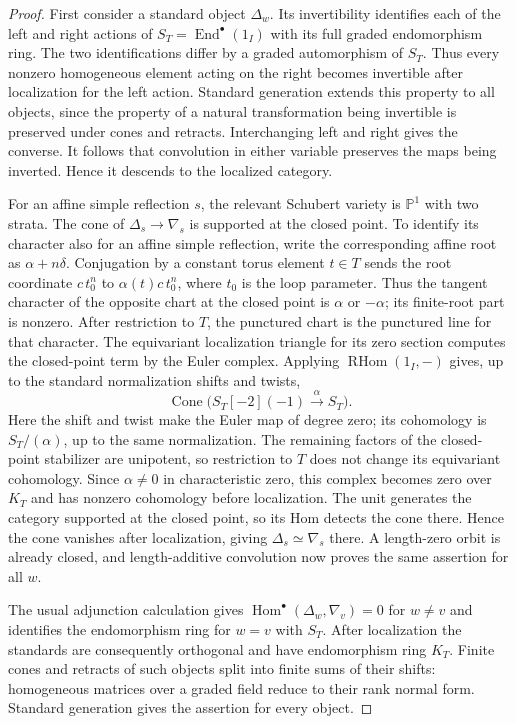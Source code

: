 \documentclass[11pt]{article}
\numberwithin{equation}{section}
\theoremstyle{definition}
\theoremstyle{remark}
\newcommand{\Hom}{\operatorname{Hom}}
\newcommand{\RHom}{\operatorname{RHom}}
\newcommand{\End}{\operatorname{End}}
\begin{document}
\begin{proof}
First consider a standard object $\Delta_w$.  Its invertibility
identifies each of the left and right actions of
$S_T=\End^\bullet(1_I)$ with its full graded endomorphism ring.
The two identifications differ by a graded automorphism of $S_T$.
Thus every nonzero homogeneous element acting on the right becomes
invertible after localization for the left action.  Standard
generation extends this property to all objects, since the property
of a natural transformation being invertible is preserved under
cones and retracts.  Interchanging left and right gives the converse.
It follows that convolution in either variable preserves the maps
being inverted.  Hence it descends to the localized category.

For an affine simple reflection $s$, the relevant Schubert variety
is $\mathbb P^1$ with two strata.  The cone of
$\Delta_s\to\nabla_s$ is supported at the closed point.
To identify its character also for an affine simple reflection,
write the corresponding affine root as $\alpha+n\delta$.
Conjugation by a constant torus element $t\in T$ sends the root
coordinate $c\,t_0^n$ to $\alpha(t)c\,t_0^n$, where $t_0$ is the
loop parameter.  Thus the tangent character of the opposite chart
at the closed point is $\alpha$ or $-\alpha$; its finite-root part
is nonzero.  After restriction to $T$, the punctured chart is the
punctured line for that character.  The equivariant localization
triangle for its zero section computes the closed-point term by
the Euler complex.  Applying $\RHom(1_I,-)$ gives, up to the
standard normalization shifts and twists,
\[
 \operatorname{Cone}\bigl(
 S_T[-2](-1)\xrightarrow{\ \alpha\ }S_T\bigr).
\]
Here the shift and twist make the Euler map of degree zero;
its cohomology is $S_T/(\alpha)$, up to the same normalization.
The remaining factors of the closed-point stabilizer are
unipotent, so restriction to $T$ does not change its equivariant
cohomology.  Since $\alpha\ne0$ in characteristic zero, this
complex becomes zero over $K_T$ and has nonzero cohomology before
localization.  The unit generates the category supported at the
closed point, so its Hom detects the cone there.  Hence the cone
vanishes after localization,
giving $\Delta_s\simeq\nabla_s$ there.  A length-zero orbit is
already closed, and length-additive convolution now proves the
same assertion for all $w$.

The usual adjunction calculation gives
$\Hom^\bullet(\Delta_w,\nabla_v)=0$ for $w\ne v$ and identifies
the endomorphism ring for $w=v$ with $S_T$.  After localization the
standards are consequently orthogonal and have endomorphism ring
$K_T$.  Finite cones and retracts of such objects split into finite
sums of their shifts: homogeneous matrices over a graded field
reduce to their rank normal form.  Standard generation gives the
assertion for every object.


\end{proof}
\end{document}
